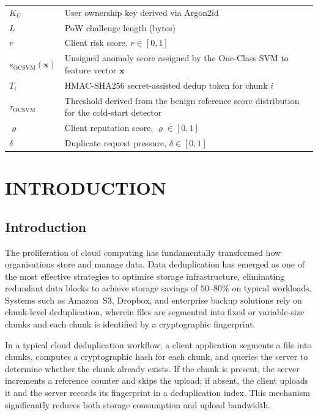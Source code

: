\documentclass[12pt,a4paper,oneside]{report}
\begin{document}
\begin{longtable}{L{3cm}L{11cm}}
$K_U$      & User ownership key derived via Argon2id \\
$L$        & PoW challenge length (bytes) \\
$r$        & Client risk score, $r \in [0,1]$ \\
$s_{\mathrm{OCSVM}}(\mathbf{x})$ & Unsigned anomaly score assigned by the One-Class SVM to feature vector $\mathbf{x}$ \\
$T_i$      & HMAC-SHA256 secret-assisted dedup token for chunk $i$ \\
$\tau_{\mathrm{OCSVM}}$ & Threshold derived from the benign reference score distribution for the cold-start detector \\
$\varrho$  & Client reputation score, $\varrho \in [0,1]$ \\
$\delta$   & Duplicate request pressure, $\delta \in [0,1]$ \\
\end{longtable}

\setcounter{page}{1}

\chapter{INTRODUCTION}

\section{Introduction}

The proliferation of cloud computing has fundamentally transformed how organisations store and manage data.
Data deduplication has emerged as one of the most effective strategies to optimise storage infrastructure, eliminating redundant data blocks to achieve storage savings of $50$--$80\%$ on typical workloads.
Systems such as Amazon~S3, Dropbox, and enterprise backup solutions rely on chunk-level deduplication, wherein files are segmented into fixed or variable-size chunks and each chunk is identified by a cryptographic fingerprint.

In a typical cloud deduplication workflow, a client application segments a file into chunks, computes a cryptographic hash for each chunk, and queries the server to determine whether the chunk already exists.
If the chunk is present, the server increments a reference counter and skips the upload; if absent, the client uploads it and the server records its fingerprint in a deduplication index.
This mechanism significantly reduces both storage consumption and upload bandwidth.
\end{document}
